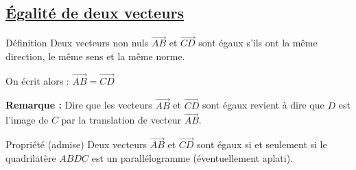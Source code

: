 \documentclass[11pt,a4paper]{article}
\begin{document}
\subsection{\textcolor{vert}{\underline{Égalité de deux vecteurs}}}

\begin{bclogo}[couleur = cyan!20, arrondi = 0.1,logo=\bcbook]{Définition}
\vspace{-0.2cm}
Deux vecteurs non nuls $\overrightarrow{AB}$ et $\overrightarrow{CD}$ sont égaux s'ils ont la même direction, le même sens et la même norme. \par 
On écrit alors : $\overrightarrow{AB} = \overrightarrow{CD}$
\end{bclogo}

\textbf{Remarque : } Dire que les vecteurs $\overrightarrow{AB}$ et $\overrightarrow{CD}$ sont égaux revient à dire que $D$ est l'image de $C$ par la translation de vecteur $\overrightarrow{AB}$.

\begin{bclogo}[couleur = green!20, arrondi = 0.1, logo=\bctrombone]{Propriété (admise)}
Deux vecteurs $\overrightarrow{AB}$ et $\overrightarrow{CD}$ sont égaux si et seulement si le quadrilatère $ABDC$ est un parallélogramme (éventuellement aplati).
\end{bclogo}
\end{document}
